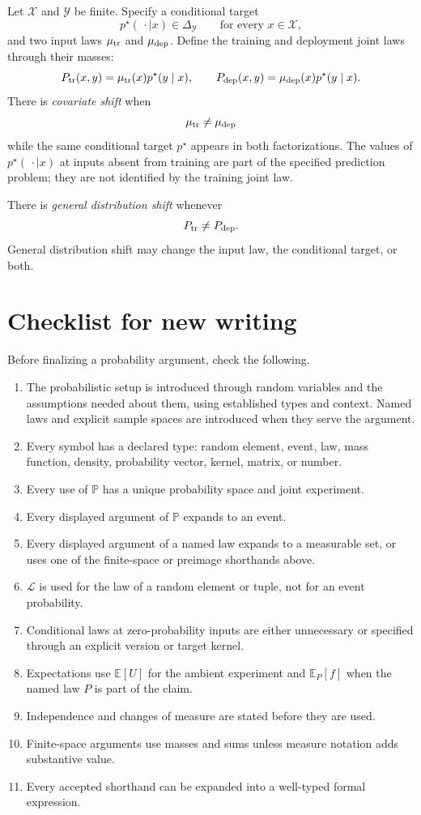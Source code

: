 \documentclass[11pt]{article}
\newcommand{\E}{\mathbb E}
\renewcommand{\P}{\mathbb P}
\newcommand{\Law}{\mathcal L}
\begin{document}
Let \(\mathcal X\) and \(\mathcal Y\) be finite. Specify a conditional target
\[
 p^\star(\,\cdot\mid x)\in\Delta_{\mathcal Y}
 \qquad\text{for every }x\in\mathcal X,
\]
and two input laws \(\mu_{\rm tr}\) and \(\mu_{\rm dep}\). Define the training
and deployment joint laws through their masses:
\begin{equation}
 P_{\rm tr}(x,y)=\mu_{\rm tr}(x)p^\star(y\mid x),
 \qquad
 P_{\rm dep}(x,y)=\mu_{\rm dep}(x)p^\star(y\mid x).
 \label{eq:covariate-shift}
\end{equation}
There is \emph{covariate shift} when
\[
 \mu_{\rm tr}\ne\mu_{\rm dep}
\]
while the same conditional target \(p^\star\) appears in both factorizations.
The values of \(p^\star(\,\cdot\mid x)\) at inputs absent from training are
part of the specified prediction problem; they are not identified by the
training joint law.

There is \emph{general distribution shift} whenever
\[
 P_{\rm tr}\ne P_{\rm dep}.
\]
General distribution shift may change the input law, the conditional target,
or both.

\section{Checklist for new writing}

Before finalizing a probability argument, check the following.

\begin{enumerate}[leftmargin=*]
\item The probabilistic setup is introduced through random variables and
the assumptions needed about them, using established types and context.
Named laws and explicit sample spaces are introduced when they serve the
argument.
\item Every symbol has a declared type: random element, event, law, mass
function, density, probability vector, kernel, matrix, or number.
\item Every use of \(\P\) has a unique probability space and joint experiment.
\item Every displayed argument of \(\P\) expands to an event.
\item Every displayed argument of a named law expands to a measurable set, or
uses one of the finite-space or preimage shorthands above.
\item \(\Law\) is used for the law of a random element or tuple, not for an
event probability.
\item Conditional laws at zero-probability inputs are either unnecessary or
specified through an explicit version or target kernel.
\item Expectations use \(\E[U]\) for the ambient experiment and
\(\E_P[f]\) when the named law \(P\) is part of the claim.
\item Independence and changes of measure are stated before they are used.
\item Finite-space arguments use masses and sums unless measure notation adds
substantive value.
\item Every accepted shorthand can be expanded into a well-typed formal
expression.
\end{enumerate}
\end{document}

